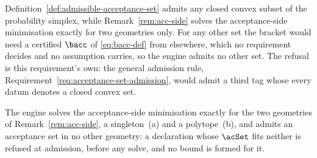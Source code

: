 
Definition~\ref{def:admissible-acceptance-set} admits any closed convex
subset of the probability simplex, while Remark~\ref{rem:acc-side} solves the
acceptance-side minimisation exactly for two geometries only. For any other
set the bracket would need a certified $\bacc$ of \eqref{eq:bacc-def} from
elsewhere, which no requirement decides and no assumption carries, so the
engine admits no other set. The refusal is this requirement's own: the
general admission rule, Requirement~\ref{req:acceptance-set-admission}, would
admit a third tag whose every datum denotes a closed convex set.

\begin{requirement}\label{req:acceptance-geometries}
The engine solves the acceptance-side minimisation exactly for the two
geometries of Remark~\ref{rem:acc-side}, a singleton~(a) and a polytope~(b),
and admits an acceptance set in no other geometry: a declaration whose
$\acSet$ fits neither is refused at admission, before any solve, and no
 bound is formed for it.
\end{requirement}
